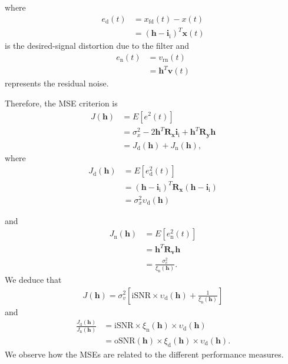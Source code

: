 \documentclass[10pt,pdflatex,headrule,landscape]{beamer}
\begin{document}
\begin{frame}[allowframebreaks]

where
\begin{align}
\label{C2-error-d}
 e_{\mathrm{d}}(t) &= x_{\mathrm{fd}}(t) - x(t) \\
 &= \left( \mathbf{h} - \mathbf{i}_{\mathrm{i}} \right)^T \mathbf{x}(t) \nonumber
\end{align}
is the desired-signal distortion due to the filter and
\begin{align}
\label{C2-error-n}
 e_{\mathrm{n}}(t) &= v_{\mathrm{rn}}(t) \\
 &= \mathbf{h}^T \mathbf{v}(t) \nonumber
\end{align}
represents the residual noise.

Therefore, the MSE criterion is
\begin{align}
\label{C2-MSE}
 J\left( \mathbf{h} \right) &= E\left[ e^2(t) \right] \\
 &= \sigma_x^2 - 2 \mathbf{h}^T \mathbf{R}_{\mathbf{x}} \mathbf{i}_{\mathrm{i}}
 + \mathbf{h}^T \mathbf{R}_{\mathbf{y}} \mathbf{h} \nonumber \\
 &= J_{\mathrm{d}}\left( \mathbf{h} \right) + J_{\mathrm{n}}\left( \mathbf{h} \right), \nonumber
\end{align}
where
\begin{align}
 \label{C2-MSE-d}
 J_{\mathrm{d}}\left( \mathbf{h} \right) &= E\left[ e_{\mathrm{d}}^2(t) \right] \\
 &= \left( \mathbf{h} - \mathbf{i}_{\mathrm{i}} \right)^T \mathbf{R}_{\mathbf{x}} \left( \mathbf{h} - \mathbf{i}_{\mathrm{i}} \right) \nonumber \\
 &= \sigma_x^2 \upsilon_{\mathrm{d}}\left(\mathbf{h} \right) \nonumber
\end{align}

and
\begin{align}
 \label{C2-MSE-n}
 J_{\mathrm{n}}\left( \mathbf{h} \right) &= E\left[ e_{\mathrm{n}}^2(t) \right] \\
 &= \mathbf{h}^T \mathbf{R}_{\mathbf{v}} \mathbf{h} \nonumber \\
 &= \frac{\sigma_v^2} { \xi_{\mathrm{n}}\left(\mathbf{h} \right) }. \nonumber
\end{align}
We deduce that
\begin{eqnarray}
 J\left( \mathbf{h} \right) = \sigma_v^2 \left[ \mathrm{iSNR} \times \upsilon_{\mathrm{d}}\left(\mathbf{h} \right)
 + \frac{1} { \xi_{\mathrm{n}}\left(\mathbf{h} \right) } \right]
\end{eqnarray}
and
\begin{align}
 \frac{J_{\mathrm{d}} \left( \mathbf{h} \right)}{J_{\mathrm{n}} \left( \mathbf{h} \right)} &=
 \mathrm{iSNR} \times \xi_{\mathrm{n}}\left(\mathbf{h} \right) \times
 \upsilon_{\mathrm{d}}\left(\mathbf{h} \right) \\
 &= \mathrm{oSNR}\left(\mathbf{h} \right) \times \xi_{\mathrm{d}}\left(\mathbf{h} \right) \times
 \upsilon_{\mathrm{d}}\left(\mathbf{h} \right). \nonumber
\end{align}
We observe how the MSEs are related to the different performance measures.


\end{frame}
\end{document}
